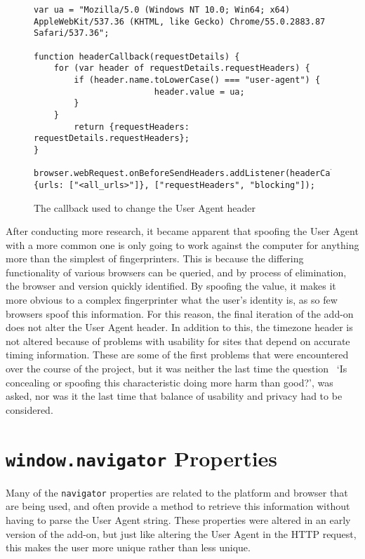 \begin{figure}[h]
\begin{lstlisting}
var ua = "Mozilla/5.0 (Windows NT 10.0; Win64; x64) AppleWebKit/537.36 (KHTML, like Gecko) Chrome/55.0.2883.87 Safari/537.36";

function headerCallback(requestDetails) {
    for (var header of requestDetails.requestHeaders) {
        if (header.name.toLowerCase() === "user-agent") {
                        header.value = ua;
        }
    }
        return {requestHeaders: requestDetails.requestHeaders};
}

browser.webRequest.onBeforeSendHeaders.addListener(headerCallback, {urls: ["<all_urls>"]}, ["requestHeaders", "blocking"]);
\end{lstlisting}
\caption{The callback used to change the User Agent header}
\label{fig:user-agent-lst}
\end{figure}

After conducting more research, it became apparent that spoofing the User Agent with a more common one is only going to work against the computer for anything more than the simplest of fingerprinters.
This is because the differing functionality of various browsers can be queried, and by process of elimination, the browser and version quickly identified.
By spoofing the value, it makes it more obvious to a complex fingerprinter what the user's identity is, as so few browsers spoof this information.
For this reason, the final iteration of the add-on does not alter the User Agent header.
In addition to this, the timezone header is not altered because of problems with usability for sites that depend on accurate timing information.
These are some of the first problems that were encountered over the course of the project, but it was neither the last time the question ~`Is concealing or spoofing this characteristic doing more harm than good?', was asked, nor was it the last time that balance of usability and privacy had to be considered.

\section{\texttt{window.navigator} Properties}

Many of the \texttt{navigator} properties are related to the platform and browser that are being used, and often provide a method to retrieve this information without having to parse the User Agent string.
These properties were altered in an early version of the add-on, but just like altering the User Agent in the HTTP request, this makes the user more unique rather than less unique.

